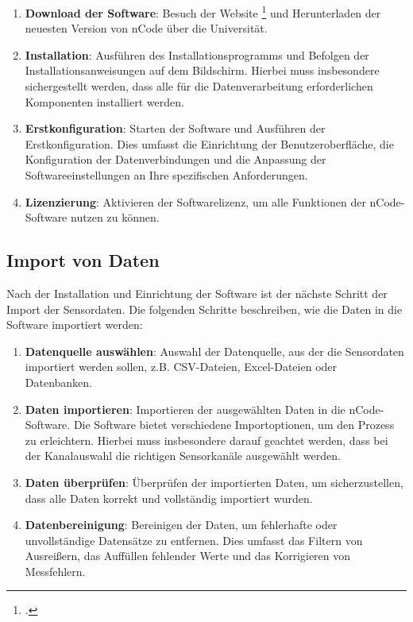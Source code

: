 \begin{enumerate}
    \item \textbf{Download der Software}: Besuch der  Website \footcite{https://wiki.unibw.de/pages/viewpage.action?pageId=103779828} und Herunterladen der neuesten Version von nCode über die Universität.
    \item \textbf{Installation}: Ausführen des Installationsprogramms und Befolgen der Installationsanweisungen auf dem Bildschirm. Hierbei muss insbesondere sichergestellt werden, dass alle für die Datenverarbeitung erforderlichen Komponenten installiert werden.
    \item \textbf{Erstkonfiguration}: Starten der Software und Ausführen der Erstkonfiguration. Dies umfasst die Einrichtung der Benutzeroberfläche, die Konfiguration der Datenverbindungen und die Anpassung der Softwareeinstellungen an Ihre spezifischen Anforderungen.
    \item \textbf{Lizenzierung}: Aktivieren der Softwarelizenz, um alle Funktionen der nCode-Software nutzen zu können.
\end{enumerate}

\subsection{Import von Daten}
Nach der Installation und Einrichtung der Software ist der nächste Schritt der Import der Sensordaten. Die folgenden Schritte beschreiben, wie die Daten in die Software importiert werden:

\begin{enumerate}
    \item \textbf{Datenquelle auswählen}: Auswahl der Datenquelle, aus der die Sensordaten importiert werden sollen, z.B. CSV-Dateien, Excel-Dateien oder Datenbanken.
    \item \textbf{Daten importieren}: Importieren der ausgewählten Daten in die nCode-Software. Die Software bietet verschiedene Importoptionen, um den Prozess zu erleichtern. Hierbei muss insbesondere darauf geachtet werden, dass bei der Kanalauswahl die richtigen Sensorkanäle ausgewählt werden.
    \item \textbf{Daten überprüfen}: Überprüfen der importierten Daten, um sicherzustellen, dass alle Daten korrekt und vollständig importiert wurden.
    \item \textbf{Datenbereinigung}: Bereinigen der Daten, um fehlerhafte oder unvollständige Datensätze zu entfernen. Dies umfasst das Filtern von Ausreißern, das Auffüllen fehlender Werte und das Korrigieren von Messfehlern.
\end{enumerate}

